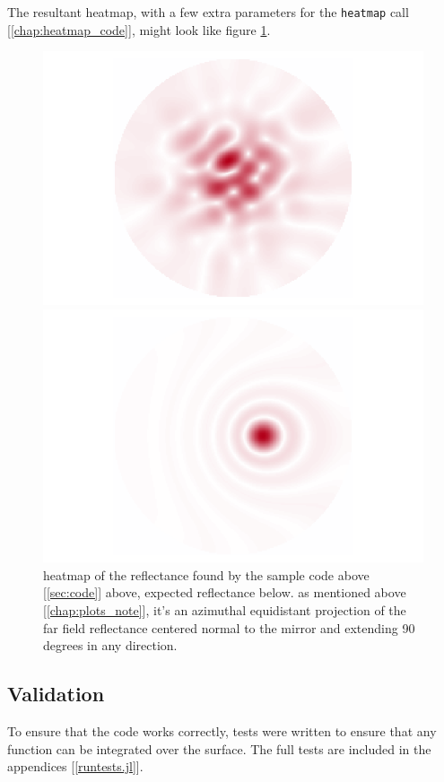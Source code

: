 \documentclass[etd,twoside,senior]{BYUPhys}
\begin{document}
The resultant heatmap, with a few extra parameters for the \texttt{heatmap} call [\ref{chap:heatmap_code}], might look like figure \ref{fig:sample_heatmap}.

\begin{figure}
  \centerline{\includegraphics[width=.7\textwidth]{sample-reflectance}}
  \centerline{\includegraphics[width=.7\textwidth]{sample-reflectance-expected}}
  \caption[heatmap from the above sample code]{\label{fig:sample_heatmap}
    heatmap of the reflectance found by the sample code above [\ref{sec:code}] above, expected reflectance below. as mentioned above [\ref{chap:plots_note}], it's an azimuthal equidistant projection of the far field reflectance centered normal to the mirror and extending 90 degrees in any direction.}
\end{figure}



\subsection{Validation} \label{sec:validation}

To ensure that the code works correctly, tests were written to ensure that any function can be integrated over the surface. The full tests are included in the appendices [\ref{runtests.jl}].
\end{document}

